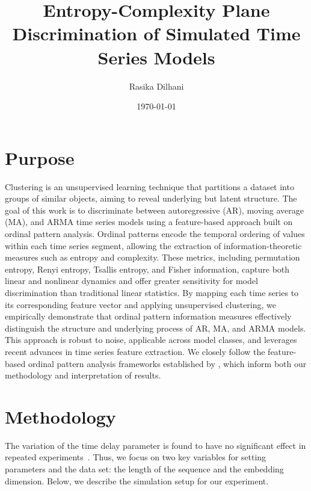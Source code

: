 \documentclass[12pt,a4paper]{article}
\title{Entropy-Complexity Plane Discrimination of Simulated Time Series Models}
\author{Rasika Dilhani}
\date{\today}
\begin{document}
	
	\maketitle
	
	\section{Purpose}
	Clustering is an unsupervised learning technique that partitions a dataset into groups of similar objects, aiming to reveal underlying but latent structure. 
	The goal of this work is to discriminate between autoregressive (AR), moving average (MA), and ARMA time series models using a feature-based approach built on ordinal pattern analysis.
	Ordinal patterns encode the temporal ordering of values within each time series segment, allowing the extraction of information-theoretic measures such as entropy and complexity.
	These metrics, including permutation entropy, Renyi entropy, Tsallis entropy, and Fisher information, capture both linear and nonlinear dynamics and offer greater sensitivity for model discrimination than traditional linear statistics.
	By mapping each time series to its corresponding feature vector and applying unsupervised clustering, we empirically demonstrate that ordinal pattern information measures effectively distinguish the structure and underlying process of AR, MA, and ARMA models. 
	This approach is robust to noise, applicable across model classes, and leverages recent advances in time series feature extraction.
	We closely follow the feature-based ordinal pattern analysis frameworks established by \cite{Boaretto2021, Chagas2022a, Rey2024, Rey2023}, which inform both our methodology and interpretation of results.
	
	
	\section{Methodology}
	The variation of the time delay parameter is found to have no significant effect in repeated experiments~\cite{Chagas2022a}. 
	Thus, we focus on two key variables for setting parameters and the data set: the length of the sequence and the embedding dimension.
	Below, we describe the simulation setup for our experiment.
	
\end{document}

